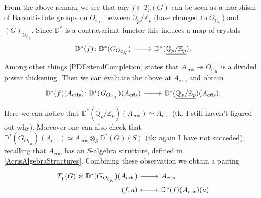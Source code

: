 \begin{rem}[]\label{constr:ComparisonMorphism}
	From the above remark we see that any $f \in T_p(G)$
	can be seen as a morphism of Barsotti-Tate groups
	on $O_{\mathbb{C}_K}$ between $\underline{\mathbb{Q}_p/\mathbb{Z}_{p}}$
	(base changed to $O_{\mathbb{C}_K}$) and $(G)_{O_{\mathbb{C}_K}}$.
	Since $\mathbb{D}^*$ is a contravariant functor this induces a map
	of crystals
	\begin{equation*}
	\begin{tikzcd}[row sep = 0ex
		,/tikz/column 1/.append style={anchor=base east}
		,/tikz/column 2/.append style={anchor=base west}]
		\mathbb{D}^*(f)\colon 
		\mathbb{D}^*(G_{O_{\mathbb{C}_K}})\arrow[r, "", rightarrow] &
		\mathbb{D}^*(\underline{\mathbb{Q}_p/\mathbb{Z}_{p}})
	.\end{tikzcd}
	\end{equation*} 
	Among other things \cref{PDExtendCompletion} states that
	$A_{\mathrm{cris}} \twoheadrightarrow O_{\mathbb{C}_K}$
	is a divided power thickening.
	Then we can evaluate the above at $A_{\mathrm{cris}}$ and obtain
	\begin{equation*}
	\begin{tikzcd}[row sep = 0ex
		,/tikz/column 1/.append style={anchor=base east}
		,/tikz/column 2/.append style={anchor=base west}]
		\mathbb{D}^*(f)(A_{\mathrm{cris}})\colon 
		\mathbb{D}^*(G_{O_{\mathbb{C}_K}})(A_{\mathrm{cris}})
		\arrow[r, "", rightarrow] &
		\mathbb{D}^*(\underline{\mathbb{Q}_p/\mathbb{Z}_{p}})(A_{\mathrm{cris}})
	.\end{tikzcd}
	\end{equation*} 
	Here we can notice that $\mathbb{D}^*(\underline{\mathbb{Q}_p/\mathbb{Z}_{p}})(A_{\mathrm{cris}})
	\simeq A_{\mathrm{cris}}$ (tk: I still haven't figured out why).
	Moreover one can also check that $\mathbb{D}^*(G_{O_{\mathbb{C}_K}})(A_{\mathrm{cris}}) \simeq
	A_{\mathrm{cris}} \otimes_S \mathbb{D}^*(G)(S)$ (tk: again I have not succeded),
	recalling that $A_{\mathrm{cris}}$ has an $S$-algebra structure,
	defined in \cref{AcrisAlgebraStructures}.
	Combining these observation we obtain a pairing
	\begin{equation*}
	\begin{tikzcd}[row sep = 0ex
		,/tikz/column 1/.append style={anchor=base east}
		,/tikz/column 2/.append style={anchor=base west}]
		T_p(G) \cross \mathbb{D}^*(G_{O_{\mathbb{C}_K}})(A_{\mathrm{cris}}) 
		\arrow[r, "", rightarrow] &
		A_{\mathrm{cris}} \\
		(f,a) \arrow[r, "", mapsto] &
		\mathbb{D}^*(f)(A_{\mathrm{cris}})(a)

\end{tikzcd}
\end{equation*}
\end{rem}
